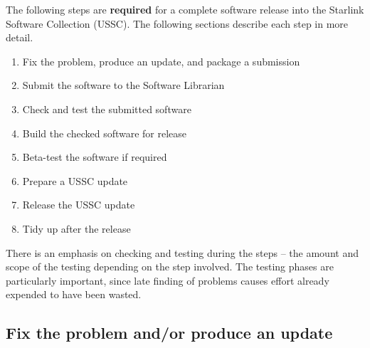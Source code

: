 The following steps are {\bf{required}} for a complete software release
into the Starlink Software Collection (USSC).  The following sections
describe each step in more detail.

\begin{enumerate}

\item Fix the problem, produce an update, and package a submission

\item Submit the software to the Software Librarian

\item Check and test the submitted software

\item Build the checked software for release

\item Beta-test the software if required

\item Prepare a USSC update

\item Release the USSC update

\item Tidy up after the release
\end{enumerate}

There is an emphasis on checking and testing during the steps -- the
amount and scope of the testing depending on the step involved.  The
testing phases are particularly important, since late finding of
problems causes effort already expended to have been wasted.

\subsection{\label{fix_the_problem}Fix the problem and/or produce an update}

